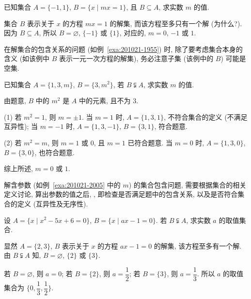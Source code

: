 \begin{example}\label{exa:201021-1955}
  已知集合 $A=\{-1,1\}$, $B=\{x\mid mx=1\}$, 且 $B\subseteq A$, 求实数 $m$ 的值.
\end{example}
\begin{solution}
  集合 $B$ 表示关于 $x$ 的方程 $mx=1$ 的解集, 而该方程至多只有一个解 (为什么?). 因为 $B\subseteq A$, 所以 $B=\varnothing$, $\{-1\}$ 或 $\{1\}$, 对应的, $m=0$, $-1$ 或 $1$.
\end{solution}

在解集合的包含关系的问题 (如例~\ref{exa:201021-1955}) 时, 除了要考虑集合本身的含义 (如该例中 $B$ 表示一元一次方程的解集), 务必注意子集 (该例中的 $B$) 可能是空集.

\begin{example}\label{exa:201021-2005}
  已知集合 $A=\{1,3,m\}$, $B=\{3,m^2\}$, 若 $B\subsetneqq A$, 求实数 $m$ 的值.
\end{example}
\begin{solution}
  由题意, $B$ 中的 $m^2$ 是 $A$ 中的元素, 且不为 $3$.
  
  (1) 若 $m^2=1$, 则 $m=\pm1$. 当 $m=1$ 时, $A=\{1,3,1\}$, 不符合集合的定义 (不满足互异性); 当 $m=-1$ 时, $A=\{1,3,-1\}$, $B=\{3,1\}$, 符合题意.
  
  (2) 若 $m^2=m$, 则 $m=1$ 或 $0$, 且 $m=1$ 已符合题意. 当 $m=0$ 时, $A=\{1,3,0\}$, $B=\{3,0\}$, 也符合题意.
  
  综上所述, $m=0$ 或 $1$.
\end{solution}

解含参数 (如例~\ref{exa:201021-2005} 中的 $m$) 的集合包含问题, 需要根据集合的相关定义讨论, 算出参数的值之后, , 即检查是否满足题中的包含关系, 以及是否符合集合的定义 (互异性及无序性).

\begin{example}
  设 $A=\{x\mid x^2-5x+6=0\}$, $B=\{x\mid ax-1=0\}$. 若 $B\subsetneqq A$, 求实数 $a$ 的取值集合.
\end{example}
\begin{solution}
  显然 $A=\{2,3\}$, $B$ 表示关于 $x$ 的方程 $ax-1=0$ 的解集, 该方程至多有一个解. 由 $B\subsetneqq A$ 知, $B=\varnothing$, $\{2\}$ 或 $\{3\}$.
  
  若 $B=\varnothing$, 则 $a=0$; 若 $B=\{2\}$, 则 $a=\dfrac12$; 若 $B=\{3\}$, 则 $a=\dfrac13$. 所以 $a$ 的取值集合为 $\biggl\{0, \dfrac13,\dfrac12\biggr\}$.
\end{solution}


\endinput